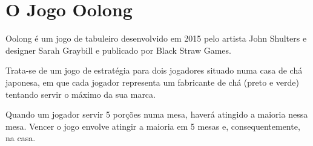 \documentclass[a4paper]{article}
\begin{document}

\newpage

%
%
%
%
%
%
%


\section{O Jogo Oolong}

Oolong é um jogo de tabuleiro desenvolvido em 2015 pelo artista John Shulters e designer Sarah Graybill e publicado por Black Straw Games. \newline


Trata-se de um jogo de estratégia para dois jogadores situado numa casa de chá japonesa, em que cada jogador representa um fabricante de chá (preto e verde) tentando servir o máximo da sua marca. 

Quando um jogador servir 5 porções numa mesa, haverá atingido a maioria nessa mesa. Vencer o jogo envolve atingir a maioria em 5 mesas e, consequentemente, na casa. \newline
\end{document}
